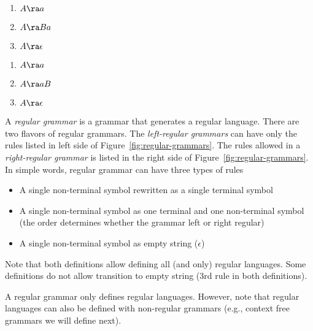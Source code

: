 \begin{marginfigure}
  \begin{tcolorbox}
    \begin{multicols}{2}
      \begin{enumerate}
        \item $A \ra a$
        \item $A \ra Ba$
        \item $A \ra \epsilon$
      \end{enumerate}
      \begin{enumerate}
        \item $A \ra a$
        \item $A \ra aB$
        \item $A \ra \epsilon$
      \end{enumerate}
    \end{multicols}
  \end{tcolorbox}
  \caption{\label{fig:regular-grammars}%
    The possible rules for left-regular (left)
    and right-regular (right) grammars.
    For both, $A$ and $B$ are non-terminal,
    $a$ is a terminal sybol ($a \in \Sigma$),
    and $\epsilon$ is the empty string.
  }
\end{marginfigure}
A \emph{regular grammar} is a grammar that generates a regular language.
There are two flavors of regular grammars.
The \emph{left-regular grammars} can have only the rules listed in left side
of Figure~\ref{fig:regular-grammars}.
The rules allowed in a \emph{right-regular grammar} is listed
in the right side of Figure~\ref{fig:regular-grammars}.
In simple words, regular grammar can have three types of rules
\begin{itemize}
  \item A single non-terminal symbol rewritten as a single terminal symbol
  \item A single non-terminal symbol as one terminal
    and one non-terminal symbol
    (the order determines whether the grammar left or right regular)
  \item A single non-terminal symbol as empty string ($\epsilon$)
\end{itemize}
Note that both definitions allow defining all (and only) regular languages.
Some definitions do not allow transition to empty string
(3rd rule in both definitions).

A regular grammar only defines regular languages.
However, note that regular languages can also be defined
with non-regular grammars (e.g., context free grammars we will define next).

